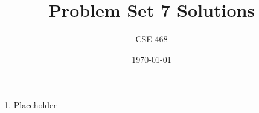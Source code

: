 \documentclass[12pt]{article}
\title{Problem Set 7 Solutions}
\author{CSE 468}
\date{\today}
\begin{document}
\maketitle

\begin{enumerate}[font=\bfseries]
    \item Placeholder
\end{enumerate}
\end{document}
